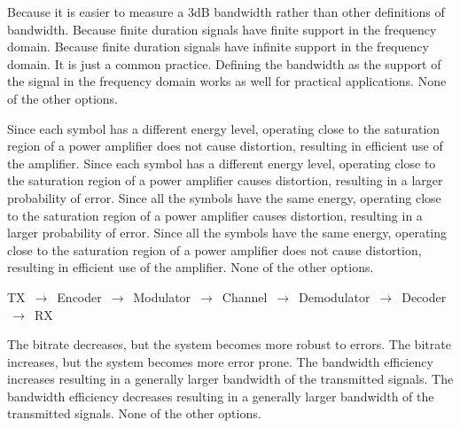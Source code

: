 \begin{questions}
    \begin{checkboxes}
        \choice Because it is easier to measure a 3dB bandwidth rather than other definitions of bandwidth.
        \CorrectChoice Because finite duration signals have finite support in the frequency domain.
        \choice Because finite duration signals have infinite support in the frequency domain.
        \choice It is just a common practice. Defining the bandwidth as the support of the signal in the frequency domain works as well for practical
        applications.
        \choice None of the other options.
    \end{checkboxes}

    \begin{checkboxes}
        \choice Since each symbol has a different energy level, operating close to the saturation region of a power amplifier does not cause distortion, resulting in efficient use of the amplifier.
        \choice Since each symbol has a different energy level, operating close to the saturation region of a power amplifier causes distortion, resulting in a larger probability of error.
        \choice Since all the symbols have the same energy, operating close to the saturation region of a power amplifier causes distortion, resulting in a larger probability of error.
        \CorrectChoice Since all the symbols have the same energy, operating close to the saturation region of a power amplifier does not cause distortion, resulting in efficient use of the amplifier.
        \choice None of the other options.
    \end{checkboxes}

    \begin{solution}
        TX $\,\to\,$ Encoder $\,\to\,$ Modulator  $\,\to\,$ Channel  $\,\to\,$ Demodulator  $\,\to\,$ Decoder  $\,\to\,$ RX
    \end{solution}

    \begin{checkboxes}
        \choice The bitrate decreases, but the system becomes more robust to errors.
        \CorrectChoice The bitrate increases, but the system becomes more error prone.
        \choice The bandwidth efficiency increases resulting in a generally larger bandwidth of the transmitted signals.
        \choice The bandwidth efficiency decreases resulting in a generally larger bandwidth of the transmitted signals.
        \choice None of the other options.
    \end{checkboxes}


\end{questions}
